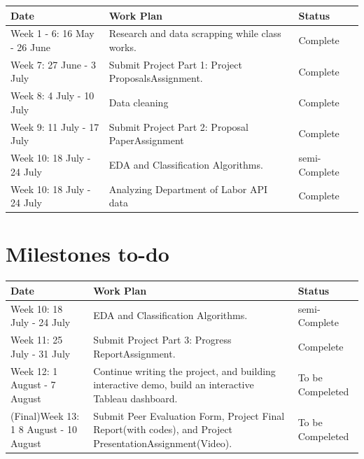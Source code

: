 \begin{center}
	\begin{tabular}{ | p{2cm} |p{3.5cm} |p{2cm} |}
		\hline
		Date & Work Plan & Status\\ \hline
		Week 1 - 6: 16 May - 26 June& Research and data scrapping while class works. &Complete\\\hline
		Week 7: 27 June - 3 July & Submit Project Part 1: Project ProposalsAssignment.  &Complete\\\hline
		Week 8: 4 July - 10 July & Data cleaning  &Complete\\\hline
		Week 9: 11 July - 17 July & Submit Project Part 2: Proposal PaperAssignment  &Complete\\\hline
		Week 10: 18 July - 24 July & EDA and Classification Algorithms.  &semi-Complete \\\hline
	Week 10: 18 July - 24 July & Analyzing Department of Labor API data  &Complete \\\hline
	\end{tabular}
\end{center}

\section{Milestones to-do}
\begin{center}
	\begin{tabular}{ | p{2cm} |p{3.5cm} |p{2cm} |}
		\hline
		Date & Work Plan & Status\\ \hline
		Week 10: 18 July - 24 July & EDA and Classification Algorithms.  &semi-Complete \\\hline
		Week 11: 25 July - 31 July & Submit Project Part 3: Progress ReportAssignment. & Compelete\\\hline
		Week 12: 1 August - 7 August & Continue writing the project, and building interactive demo, build  an interactive Tableau dashboard. & To be Compeleted\\\hline
		(Final)Week 13: 1 8 August - 10 August & Submit Peer Evaluation Form, Project Final Report(with codes), and Project PresentationAssignment(Video).& To be Compeleted\\\hline
	\end{tabular}
\end{center}

